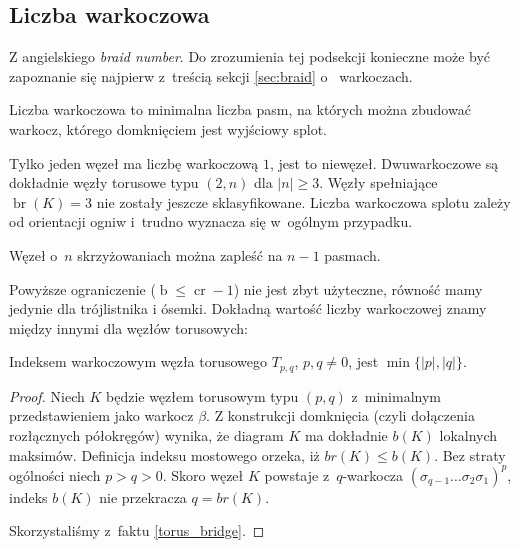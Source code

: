 
\subsection{Liczba warkoczowa} %
\label{sub:braid_number}
Z angielskiego \emph{braid number}.
Do zrozumienia tej podsekcji konieczne może być zapoznanie się najpierw z~treścią sekcji \ref{sec:braid} o~ warkoczach.

\begin{definition}
    Liczba warkoczowa to minimalna liczba pasm, na których można zbudować warkocz, którego domknięciem jest wyjściowy splot.
\end{definition}

Tylko jeden węzeł ma liczbę warkoczową $1$, jest to niewęzeł.
Dwuwarkoczowe są dokładnie węzły torusowe typu $(2, n)$ dla $|n| \ge 3$.
Węzły spełniające $\operatorname{br} (K) = 3$ nie zostały jeszcze sklasyfikowane.
Liczba warkoczowa splotu zależy od orientacji ogniw i~trudno wyznacza się w~ogólnym przypadku.

\begin{proposition}
    Węzeł o~$n$ skrzyżowaniach można zapleść na $n - 1$ pasmach.
\end{proposition}

Powyższe ograniczenie ($\operatorname{b} \le \operatorname{cr} - 1$) nie jest zbyt użyteczne, równość mamy jedynie dla trójlistnika i ósemki.
Dokładną wartość liczby warkoczowej znamy między innymi dla węzłów torusowych:

\begin{proposition}
    Indeksem warkoczowym węzła torusowego $T_{p, q}$, $p, q \neq 0$, jest $\min\{|p|, |q|\}$.
\end{proposition}

\begin{proof}
    Niech $K$ będzie węzłem torusowym typu $(p,q)$ z~minimalnym przedstawieniem jako warkocz $\beta$.
    Z konstrukcji domknięcia (czyli dołączenia rozłącznych półokręgów) wynika,
    że diagram $K$ ma dokładnie $b(K)$ lokalnych maksimów.
    Definicja indeksu mostowego orzeka, iż $br(K) \le b(K)$.
    Bez straty ogólności niech $p > q > 0$.
    Skoro węzeł $K$ powstaje z~$q$-warkocza $(\sigma_{q-1} \ldots \sigma_2\sigma_1)^p$,
    indeks $b(K)$ nie przekracza $q = br(K)$.

    Skorzystaliśmy z~faktu \ref{torus_bridge}.
\end{proof}

